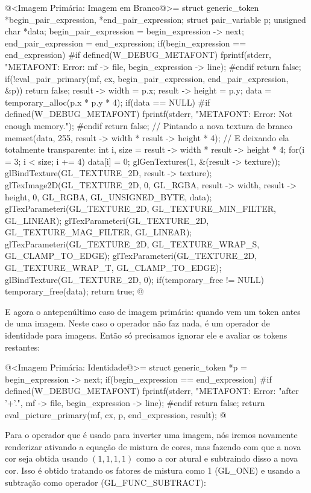 {{{{{{\iniciocodigo
@<Imagem Primária: Imagem em Branco@>=
struct generic_token *begin_pair_expression, *end_pair_expression;
struct pair_variable p;
unsigned char *data;
begin_pair_expression = begin_expression -> next;
end_pair_expression = end_expression;
if(begin_expression == end_expression){
#if defined(W_DEBUG_METAFONT)
  fprintf(stderr, "METAFONT: Error: %
          mf -> file, begin_expression -> line);
#endif
  return false;
}
if(!eval_pair_primary(mf, cx, begin_pair_expression, end_pair_expression, &p))
  return false;
result -> width = p.x;
result -> height = p.y;
data = temporary_alloc(p.x * p.y * 4);
if(data == NULL){
#if defined(W_DEBUG_METAFONT)
  fprintf(stderr, "METAFONT: Error: Not enough memory.\n");
#endif
  return false;
}
// Pintando a nova textura de branco
memset(data, 255, result -> width * result -> height * 4);
{ // E deixando ela totalmente transparente:
  int i, size = result -> width * result -> height * 4;
  for(i = 3; i < size; i += 4)
    data[i] = 0;
}
glGenTextures(1, &(result -> texture));
glBindTexture(GL_TEXTURE_2D, result -> texture);
glTexImage2D(GL_TEXTURE_2D, 0, GL_RGBA, result -> width, result -> height, 0,
             GL_RGBA, GL_UNSIGNED_BYTE, data);
glTexParameteri(GL_TEXTURE_2D, GL_TEXTURE_MIN_FILTER, GL_LINEAR);
glTexParameteri(GL_TEXTURE_2D, GL_TEXTURE_MAG_FILTER, GL_LINEAR);
glTexParameteri(GL_TEXTURE_2D, GL_TEXTURE_WRAP_S, GL_CLAMP_TO_EDGE);
glTexParameteri(GL_TEXTURE_2D, GL_TEXTURE_WRAP_T, GL_CLAMP_TO_EDGE);
glBindTexture(GL_TEXTURE_2D, 0);
if(temporary_free != NULL)
  temporary_free(data);
return true;
@
\fimcodigo

E agora o antepenúltimo caso de imagem primária: quando vem um
token \monoespaco{+} antes de uma imagem. Neste caso o operador não faz
nada, é um operador de identidade para imagens. Então só precisamos
ignorar ele e avaliar os tokens restantes:

\iniciocodigo
@<Imagem Primária: Identidade@>=
struct generic_token *p = begin_expression -> next;
if(begin_expression == end_expression){
#if defined(W_DEBUG_METAFONT)
  fprintf(stderr, "METAFONT: Error: %
                  "after '+'.\n", mf -> file, begin_expression -> line);
#endif
  return false;
}
return eval_picture_primary(mf, cx, p, end_expression, result);
@
\fimcodigo

Para o operador \monoespaco{-} que é usado para inverter uma imagem,
nós iremos novamente renderizar ativando a equação de mistura de
cores, mas fazendo com que a nova cor seja obtida usando $(1, 1, 1,
1)$ como a cor atural e subtraindo disso a nova cor. Isso é obtido
tratando os fatores de mistura como 1 (GL\_ONE) e usando a subtração
como operador (GL\_FUNC\_SUBTRACT):


}}}}}}
